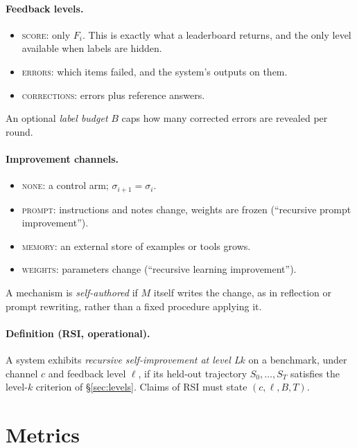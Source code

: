 \documentclass[11pt]{article}
\begin{document}
\paragraph{Feedback levels.}
\begin{itemize}
  \item \textsc{score}: only $F_i$. This is exactly what a leaderboard returns, and the only level available when labels are hidden.
  \item \textsc{errors}: which items failed, and the system's outputs on them.
  \item \textsc{corrections}: errors plus reference answers.
\end{itemize}
An optional \emph{label budget} $B$ caps how many corrected errors are revealed per round.

\paragraph{Improvement channels.}
\begin{itemize}
  \item \textsc{none}: a control arm; $\sigma_{i+1} = \sigma_i$.
  \item \textsc{prompt}: instructions and notes change, weights are frozen (``recursive prompt improvement'').
  \item \textsc{memory}: an external store of examples or tools grows.
  \item \textsc{weights}: parameters change (``recursive learning improvement'').
\end{itemize}
A mechanism is \emph{self-authored} if $M$ itself writes the change, as in reflection or prompt rewriting, rather than a fixed procedure applying it.

\paragraph{Definition (RSI, operational).} A system exhibits \emph{recursive self-improvement at level L$k$} on a benchmark, under channel $c$ and feedback level $\ell$, if its held-out trajectory $S_0,\dots,S_T$ satisfies the level-$k$ criterion of \S\ref{sec:levels}. Claims of RSI must state $(c, \ell, B, T)$.

\section{Metrics}
\label{sec:metrics}
\end{document}
